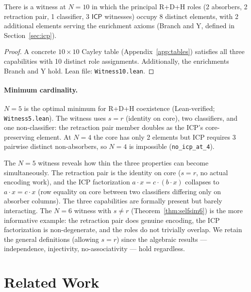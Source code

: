 \documentclass[sigconf,screen]{acmart}
\newcommand{\dotop}{\cdot}
\newcommand{\ICP}{\textsf{ICP}}
\theoremstyle{remark}
\begin{document}
\begin{proposition}
\label{thm:separated}
There is a witness at $N\!=\!10$ in which the principal R+D+H roles (2 absorbers, 2 retraction pair, 1 classifier, 3 $\ICP$ witnesses) occupy 8 distinct elements, with 2 additional elements serving the enrichment axioms (Branch and Y, defined in Section~\ref{sec:icp}).
\end{proposition}

\begin{proof}
A concrete $10 \times 10$ Cayley table (Appendix~\ref{app:tables}) satisfies all three capabilities with 10 distinct role assignments. Additionally, the enrichments Branch and Y hold. Lean file: \texttt{Witness10.lean}.
\end{proof}

\paragraph{Minimum cardinality.}
$N\!=\!5$ is the optimal minimum for R+D+H coexistence (Lean-verified; \texttt{Witness5.lean}). The witness uses $s = r$ (identity on core), two classifiers, and one non-classifier: the retraction pair member doubles as the ICP's core-preserving element. At $N\!=\!4$ the core has only 2 elements but ICP requires 3 pairwise distinct non-absorbers, so $N\!=\!4$ is impossible (\texttt{no\_icp\_at\_4}).

The $N\!=\!5$ witness reveals how thin the three properties can become simultaneously. The retraction pair is the identity on core ($s = r$, no actual encoding work), and the ICP factorization $a \dotop x = c \dotop (b \dotop x)$ collapses to $a \dotop x = c \dotop x$ (row equality on core between two classifiers differing only on absorber columns). The three capabilities are formally present but barely interacting. The $N\!=\!6$ witness with $s \neq r$ (Theorem~\ref{thm:selfsim6}) is the more informative example: the retraction pair does genuine encoding, the ICP factorization is non-degenerate, and the roles do not trivially overlap. We retain the general definitions (allowing $s = r$) since the algebraic results --- independence, injectivity, no-associativity --- hold regardless.

\section{Related Work}
\label{sec:related}
\end{document}
